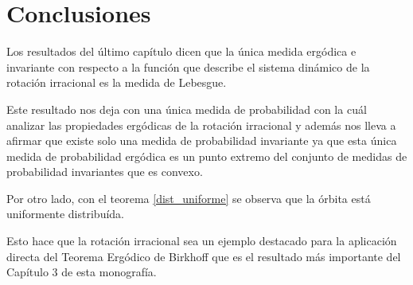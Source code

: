 \chapter*{Conclusiones}

Los resultados del último capítulo dicen que la única medida ergódica e invariante con respecto a la función que describe el sistema dinámico de la rotación irracional es la medida de Lebesgue.

Este resultado nos deja con una única medida de probabilidad con la cuál analizar las propiedades ergódicas de la rotación irracional y además nos lleva a afirmar que existe solo una medida de probabilidad invariante ya que esta única medida de probabilidad ergódica es un punto extremo del conjunto de medidas de probabilidad invariantes que es convexo.

Por otro lado, con el teorema \ref{dist_uniforme} se observa que la órbita está uniformente distribuída.

Esto hace que la rotación irracional sea un ejemplo destacado para la aplicación directa del Teorema Ergódico de Birkhoff que es el resultado más importante del Capítulo 3 de esta monografía.